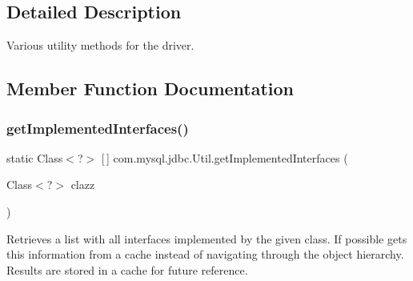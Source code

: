 \subsection{Detailed Description}
Various utility methods for the driver. 

\subsection{Member Function Documentation}
\mbox{\label{classcom_1_1mysql_1_1jdbc_1_1_util_a35e35548da42c684a68e73f8ccfc2fdb}} 
\subsubsection{\texorpdfstring{get\+Implemented\+Interfaces()}{getImplementedInterfaces()}}
{\footnotesize\ttfamily static Class$<$?$>$ \mbox{[}$\,$\mbox{]} com.\+mysql.\+jdbc.\+Util.\+get\+Implemented\+Interfaces (\begin{DoxyParamCaption}\item[{Class$<$?$>$}]{clazz }\end{DoxyParamCaption})\hspace{0.3cm}{\ttfamily [static]}}

Retrieves a list with all interfaces implemented by the given class. If possible gets this information from a cache instead of navigating through the object hierarchy. Results are stored in a cache for future reference.


